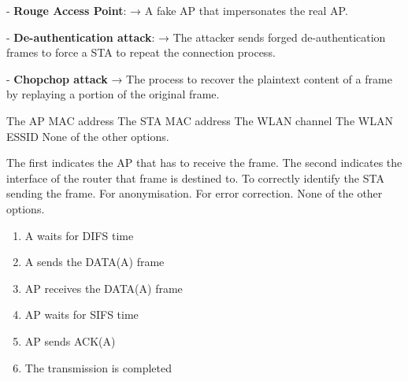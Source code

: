 \begin{questions}
\begin{solution}
        - \textbf{Rouge Access Point}: → A fake AP that impersonates the real AP.

        - \textbf{De-authentication attack}: → The attacker sends forged de-authentication frames to force a STA to repeat the connection process.

        - \textbf{Chopchop attack} → The process to recover the plaintext content of a frame by replaying a portion of the original frame.
    \end{solution}



    \begin{checkboxes}
        \CorrectChoice The AP MAC address
        \CorrectChoice The STA MAC address
        \CorrectChoice The WLAN channel
        \choice The WLAN ESSID
        \choice None of the other options.
    \end{checkboxes}



    \begin{checkboxes}
        \CorrectChoice The first indicates the AP that has to receive the frame. The second indicates the interface of the router that frame is destined to.
        \choice To correctly identify the STA sending the frame.
        \choice For anonymisation.
        \choice For error correction.
        \choice None of the other options.
    \end{checkboxes}

    \begin{solution}
        \begin{enumerate}
            \item A waits for DIFS time
            \item A sends the DATA(A) frame
            \item AP receives the DATA(A) frame
            \item AP waits for SIFS time
            \item AP sends ACK(A)
            \item The transmission is completed
        \end{enumerate}
    \end{solution}


\end{questions}
